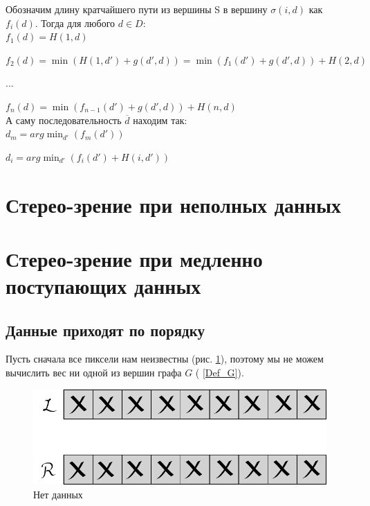 	Обозначим длину кратчайшего пути из вершины S в вершину $\sigma(i, d)$ как $f_i(d)$. 
	Тогда для любого $d \in D$:\\
	
		$f_1(d) = H(1, d)$
		
		$f_2(d) = \min(H(1,d') + g(d', d)) = \min(f_1(d') + g(d', d)) + H(2,d)$
		
	 	...
	 	
	 	$f_n(d) = \min(f_{n-1}(d') + g(d', d)) + H(n,d)$\\

	А саму последовательность $\overline{d}$ находим так:\\
	
		$d_m = arg\min_{d'} (f_m(d'))$
		
		$d_i = arg\min_{d'} (f_i(d') + H(i,d'))$	
\section{Стерео-зрение при неполных данных}

\section{Стерео-зрение при медленно поступающих данных}
\newpage
\subsection{Данные приходят по порядку}
Пусть сначала все пиксели нам неизвестны (рис. \ref{1.4_im_nodata}), поэтому мы не можем вычислить вес ни одной из вершин графа $G$ ( \ref{Def_G}).
\begin{figure}[h!]
	\centering
	\includegraphics[scale = 0.7]{allclosed2.pdf}
	\caption{Нет данных}
	\label{1.4_im_nodata}
\end{figure}

